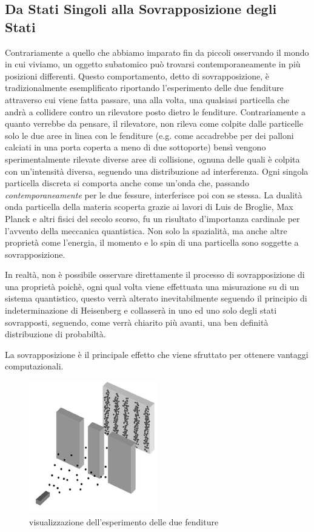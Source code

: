 \documentclass[12pt,a4paper,openright]{report}
\begin{document}
\subsection{Da Stati Singoli alla Sovrapposizione degli Stati}
  Contrariamente a quello che abbiamo imparato fin da piccoli osservando il mondo in cui viviamo, un oggetto subatomico può trovarsi contemporaneamente in più posizioni differenti.
  Questo comportamento, detto di sovrapposizione, è tradizionalmente esemplificato riportando l'esperimento \cite{ref13} delle due fenditure attraverso cui viene 
  fatta passare, una alla volta, una qualsiasi particella che andrà a collidere contro un rilevatore posto dietro le fenditure. Contrariamente a quanto verrebbe da pensare,
  il rilevatore, non rileva come colpite dalle particelle solo le due aree in linea con le fenditure (e.g. come accadrebbe per dei palloni calciati in una porta coperta a meno di due sottoporte) bensì vengono 
  sperimentalmente rilevate diverse aree di collisione, ognuna delle quali è colpita con un'intensità diversa, seguendo una distribuzione ad interferenza.
  Ogni singola particella discreta si comporta anche come un'onda che, passando \emph{contemporaneamente} per le due fessure, interferisce poi con se stessa.
  La dualità onda particella della materia scoperta grazie ai lavori di Luis de Broglie, Max Planck e altri fisici del secolo scorso, fu un risultato d'importanza cardinale per l'avvento della meccanica quantistica.
  Non solo la spazialità, ma anche altre proprietà come l'energia, il momento e lo spin di una particella sono soggette a sovrapposizione.\par
  In realtà, non è possibile osservare direttamente il processo di sovrapposizione di una proprietà poichè, ogni qual volta viene effettuata una misurazione su di un
  sistema quantistico, questo verrà alterato inevitabilmente seguendo il principio di indeterminazione di Heisenberg e collasserà in uno ed uno solo degli stati sovrapposti, seguendo, come verrà chiarito più avanti, una ben definità distribuzione di probabiltà.\par
  La sovrapposizione è il principale effetto che viene sfruttato per ottenere vantaggi computazionali. 
\begin{figure}[h]
    \centering
    \includegraphics[width=0.5\textwidth]{double-slit-electrons1}
    \caption{visualizzazione dell'esperimento delle due fenditure}
\end{figure}
  
\end{document}
